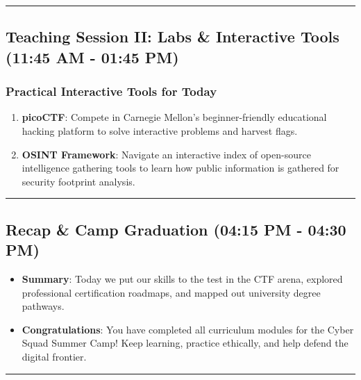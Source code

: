 \documentclass[12pt,openany]{book}
\begin{document}
\medskip\noindent\rule{\linewidth}{0.4pt}\medskip

\medskip

\subsection*{Teaching Session II: Labs \& Interactive Tools (11:45 AM - 01:45 PM)}


\subsubsection*{Practical Interactive Tools for Today}


\begin{enumerate}

  \item \textbf{picoCTF}: Compete in Carnegie Mellon's beginner-friendly educational hacking platform to solve interactive problems and harvest flags.

  \item \textbf{OSINT Framework}: Navigate an interactive index of open-source intelligence gathering tools to learn how public information is gathered for security footprint analysis.

\end{enumerate}


\medskip\noindent\rule{\linewidth}{0.4pt}\medskip

\medskip

\subsection*{Recap \& Camp Graduation (04:15 PM - 04:30 PM)}


\begin{itemize}

  \item \textbf{Summary}: Today we put our skills to the test in the CTF arena, explored professional certification roadmaps, and mapped out university degree pathways.

  \item \textbf{Congratulations}: You have completed all curriculum modules for the Cyber Squad Summer Camp! Keep learning, practice ethically, and help defend the digital frontier.

\end{itemize}


\medskip\noindent\rule{\linewidth}{0.4pt}\medskip

\medskip
\end{document}
